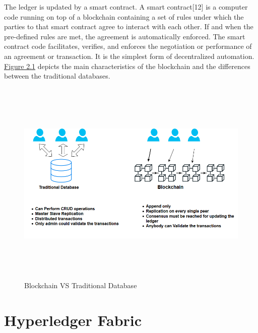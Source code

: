 The ledger is updated by a smart contract. A smart contract[12] is a computer code running on top of a blockchain containing a set of rules under which the parties to that smart contract agree to interact with each other. If and when the pre-defined rules are met, the agreement is automatically enforced. The smart contract code facilitates, verifies, and enforces the negotiation or performance of an agreement or transaction. It is the simplest form of decentralized automation.
 \\ 
 \hyperref[fig:bcvsdb]{Figure 2.1} depicts the main characteristics of the blockchain and the differences between the traditional databases.
\begin{figure}[H]
	\includegraphics[width=15cm,height=10cm]{images/bcvsdb.png}
	\caption{Blockchain VS Traditional Database}
	\label{fig:bcvsdb}
	\end{figure}

\section{Hyperledger Fabric}
 
